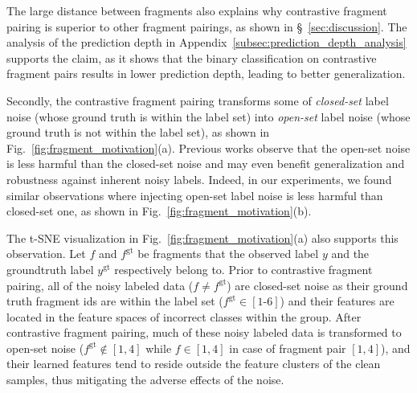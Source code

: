 \documentclass{article}
\theoremstyle{plain}
\theoremstyle{definition}
\theoremstyle{remark}
\begin{document}
The large distance between fragments also explains why contrastive fragment pairing is superior to other fragment pairings, as shown in \S~\ref{sec:discussion}.
The analysis of the prediction depth \citep{baldock21nips} in Appendix~\ref{subsec:prediction_depth_analysis} supports the claim, as it shows that the binary classification on contrastive fragment pairs results in lower prediction depth, leading to better generalization.

Secondly, the contrastive fragment pairing transforms some of \textit{closed-set} label noise (whose ground truth is within the label set) into \textit{open-set} label noise (whose ground truth is not within the label set), as shown in Fig.~\ref{fig:fragment_motivation}(a).
Previous works \citep{wei2021open, wan2024unlocking} observe that the open-set noise is less harmful than the closed-set noise and may even benefit generalization and robustness against inherent noisy labels.
Indeed, in our experiments, we found similar observations where injecting open-set label noise is less harmful than closed-set one, as shown in Fig.~\ref{fig:fragment_motivation}(b).

The t-SNE visualization in Fig.~\ref{fig:fragment_motivation}(a) also supports this observation.
Let $f$ and $f^\text{gt}$ be fragments that the observed label $y$ and the groundtruth label $y^\text{gt}$ respectively belong to.
Prior to contrastive fragment pairing, all of the noisy labeled data ($f\neq f^\text{gt}$) are \textcolor[HTML]{E73359}{closed-set noise} as their ground truth fragment ids are within the label set ($f^\text{gt}\in[1\text{-}6]$) and their features %
are located in the feature spaces of incorrect classes within the group.
After contrastive fragment pairing, much of these noisy labeled data is transformed to \textcolor[HTML]{0000F5}{open-set noise} ($f^\text{gt}\notin[1,4]$ while $f\in[1,4]$ in case of fragment pair $[1, 4]$), 
and their learned features tend to reside outside the feature clusters of the clean samples, thus mitigating the adverse effects of the noise.
\end{document}
